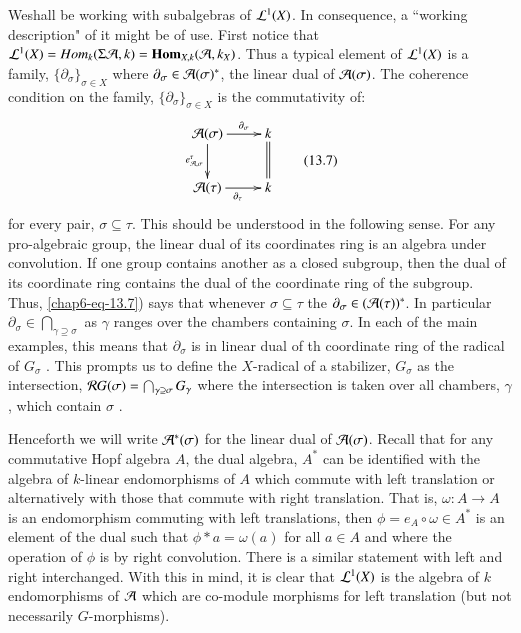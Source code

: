 We\pageoriginale shall be working with subalgebras of $\mathcal{L}^{1}(X)$. In consequence, a ``working description" of it might be of use. First notice that $\mathcal{L}^{1}(X) = Hom_{k}(\Sigma \mathcal{A}, k) = \operatorname{\mathbf{Hom}}_{X, k}(\mathcal{A}, k_{X})$. Thus a typical element of $\mathcal{L}^{1}(X)$ is a family, $\{\partial_{\sigma}\}_{\sigma \in X}$ where $\partial_{\sigma} \in \mathcal{A}(\sigma)^{*}$, the linear dual of $\mathcal{A}(\sigma)$. The coherence condition on the family, $\{\partial_{\sigma}\}_{\sigma \in X}$ is the commutativity of:
\begin{equation*}\label{chap6-eq-13.7}
\vcenter{
\xymatrix{
\calA(\sigma) \ar[d]_-{e_{\calA, \sigma}^{\tau}} \ar[r]^-{\partial_{\sigma}} & k \ar@{=}[d]\\
\calA(\tau) \ar[r]_{\partial_{\tau}} & k
}}\tag{13.7}
\end{equation*}
for every pair, $\sigma \subseteq \tau$. This should be understood in the following sense. For any pro-algebraic group, the linear dual of its coordinates ring is an algebra under convolution. If one group contains another as a closed subgroup, then the dual of its coordinate ring contains the dual of the coordinate ring of the subgroup. Thus,
\ref{chap6-eq-13.7}) says that whenever $\sigma \subseteq \tau$ the $\partial_{\sigma} \in (\mathcal{A}(\tau))^{*}$. In particular $\partial_{\sigma} \in \bigcap_{\gamma \supseteq \sigma}$ as $\gamma$ ranges over the chambers containing $\sigma$. In each of the main examples, this means that $\partial_{\sigma}$ is in linear dual of th coordinate ring of the radical of $G_{\sigma}$ . This prompts us to define the $X$-radical of a stabilizer, $G_{\sigma}$ as the intersection, $\mathcal{R} G(\sigma) = \bigcap_{\gamma \supseteq \sigma}G_{\gamma}$ where the intersection is taken over all chambers, $\gamma$, which contain $\sigma$ .

Henceforth we will write $\mathcal{A}^{*}(\sigma)$ for the linear dual of $\mathcal{A}(\sigma)$. Recall that for any commutative Hopf algebra $A$, the dual algebra, $A^{*}$ can be identified with the algebra of $k$-linear endomorphisms of $A$ which commute with left translation or alternatively with those that commute with right translation. That is, $\omega : A\rightarrow A$ is an endomorphism commuting with left translations, then $\phi = e_{A} \circ \omega \in A^{*}$ is an element of the dual such that $\phi * a = \omega (a)$ for all $a\in A$ and where the operation of $\phi$ is by right convolution. There is a similar statement with left and right interchanged. With this in mind, it is clear that $\mathcal{L}^{1}(X)$ is the algebra of $k$ endomorphisms of $\mathcal{A}$ which are co-module morphisms for left translation (but not necessarily $G$-morphisms).

